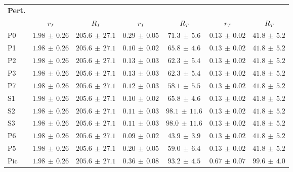 \begin{tabular}{@{}lcccccc@{}}
\toprule
\textbf{Pert.} & \multicolumn{2}{c}{\textbf{\BO{}}} & \multicolumn{2}{c}{\textbf{\CBO{}}} & \multicolumn{2}{c}{\textbf{\QCBO{}}} \\
\cmidrule(lr){2-3}\cmidrule(lr){4-5}\cmidrule(lr){6-7}
 & $r_T$ & $R_T$ & $r_T$ & $R_T$ & $r_T$ & $R_T$ \\
\midrule
P0 & $1.98{\scriptstyle\,\pm\,}0.26$ & $205.6{\scriptstyle\,\pm\,}27.1$ & $0.29{\scriptstyle\,\pm\,}0.05$ & $71.3{\scriptstyle\,\pm\,}5.6$ & $0.13{\scriptstyle\,\pm\,}0.02$ & $41.8{\scriptstyle\,\pm\,}5.2$ \\
P1 & $1.98{\scriptstyle\,\pm\,}0.26$ & $205.6{\scriptstyle\,\pm\,}27.1$ & $0.10{\scriptstyle\,\pm\,}0.02$ & $65.8{\scriptstyle\,\pm\,}4.6$ & $0.13{\scriptstyle\,\pm\,}0.02$ & $41.8{\scriptstyle\,\pm\,}5.2$ \\
P2 & $1.98{\scriptstyle\,\pm\,}0.26$ & $205.6{\scriptstyle\,\pm\,}27.1$ & $0.13{\scriptstyle\,\pm\,}0.03$ & $62.3{\scriptstyle\,\pm\,}5.4$ & $0.13{\scriptstyle\,\pm\,}0.02$ & $41.8{\scriptstyle\,\pm\,}5.2$ \\
P3 & $1.98{\scriptstyle\,\pm\,}0.26$ & $205.6{\scriptstyle\,\pm\,}27.1$ & $0.13{\scriptstyle\,\pm\,}0.03$ & $62.3{\scriptstyle\,\pm\,}5.4$ & $0.13{\scriptstyle\,\pm\,}0.02$ & $41.8{\scriptstyle\,\pm\,}5.2$ \\
P7 & $1.98{\scriptstyle\,\pm\,}0.26$ & $205.6{\scriptstyle\,\pm\,}27.1$ & $0.12{\scriptstyle\,\pm\,}0.03$ & $58.1{\scriptstyle\,\pm\,}5.5$ & $0.13{\scriptstyle\,\pm\,}0.02$ & $41.8{\scriptstyle\,\pm\,}5.2$ \\
S1 & $1.98{\scriptstyle\,\pm\,}0.26$ & $205.6{\scriptstyle\,\pm\,}27.1$ & $0.10{\scriptstyle\,\pm\,}0.02$ & $65.8{\scriptstyle\,\pm\,}4.6$ & $0.13{\scriptstyle\,\pm\,}0.02$ & $41.8{\scriptstyle\,\pm\,}5.2$ \\
S2 & $1.98{\scriptstyle\,\pm\,}0.26$ & $205.6{\scriptstyle\,\pm\,}27.1$ & $0.11{\scriptstyle\,\pm\,}0.03$ & $98.1{\scriptstyle\,\pm\,}11.6$ & $0.13{\scriptstyle\,\pm\,}0.02$ & $41.8{\scriptstyle\,\pm\,}5.2$ \\
S3 & $1.98{\scriptstyle\,\pm\,}0.26$ & $205.6{\scriptstyle\,\pm\,}27.1$ & $0.11{\scriptstyle\,\pm\,}0.03$ & $98.0{\scriptstyle\,\pm\,}11.6$ & $0.13{\scriptstyle\,\pm\,}0.02$ & $41.8{\scriptstyle\,\pm\,}5.2$ \\
P6 & $1.98{\scriptstyle\,\pm\,}0.26$ & $205.6{\scriptstyle\,\pm\,}27.1$ & $0.09{\scriptstyle\,\pm\,}0.02$ & $43.9{\scriptstyle\,\pm\,}3.9$ & $0.13{\scriptstyle\,\pm\,}0.02$ & $41.8{\scriptstyle\,\pm\,}5.2$ \\
P5 & $1.98{\scriptstyle\,\pm\,}0.26$ & $205.6{\scriptstyle\,\pm\,}27.1$ & $0.20{\scriptstyle\,\pm\,}0.05$ & $59.0{\scriptstyle\,\pm\,}6.4$ & $0.13{\scriptstyle\,\pm\,}0.02$ & $41.8{\scriptstyle\,\pm\,}5.2$ \\
Pic & $1.98{\scriptstyle\,\pm\,}0.26$ & $205.6{\scriptstyle\,\pm\,}27.1$ & $0.36{\scriptstyle\,\pm\,}0.08$ & $93.2{\scriptstyle\,\pm\,}4.5$ & $0.67{\scriptstyle\,\pm\,}0.07$ & $99.6{\scriptstyle\,\pm\,}4.0$ \\
\bottomrule
\end{tabular}
